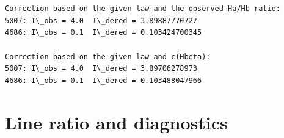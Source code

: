 \documentclass{report}
\begin{document}
    
    \begin{center}
    \end{center}
    { \hspace*{\fill} \\}
    
    \begin{center}
    \end{center}
    { \hspace*{\fill} \\}
    
    \begin{Verbatim}[commandchars=\\\{\}]
Correction based on the given law and the observed Ha/Hb ratio:
5007: I\_obs = 4.0  I\_dered = 3.89887770727
4686: I\_obs = 0.1  I\_dered = 0.103424700345

Correction based on the given law and c(Hbeta):
5007: I\_obs = 4.0  I\_dered = 3.89706278973
4686: I\_obs = 0.1  I\_dered = 0.103488047966
    \end{Verbatim}


    \section{Line ratio and diagnostics}
\end{document}
